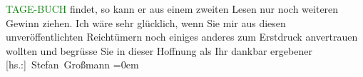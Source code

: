                   \textcolor{green}{TAGE-BUCH}{}\ledrightnote{\textcolor{green}{Das Tage-Buch}} findet, so kann {\pb}er aus einem zweiten Lesen nur
               noch weiteren Gewinn ziehen.\pend
           \pstart
           Ich wäre sehr glücklich, wenn Sie mir aus diesen unveröffentlichten Reichtümern noch
               einiges anderes zum Erstdruck anvertrauen wollten und begrüsse Sie in dieser Hoffnung
               als\pend
           \pstart
           Ihr dankbar ergebener{\\[\baselineskip]}\spacefill\mbox{{[}hs.:{]} Stefan Großmann}\pend
           \leftskip=0em{}\endnumbering{}  
      